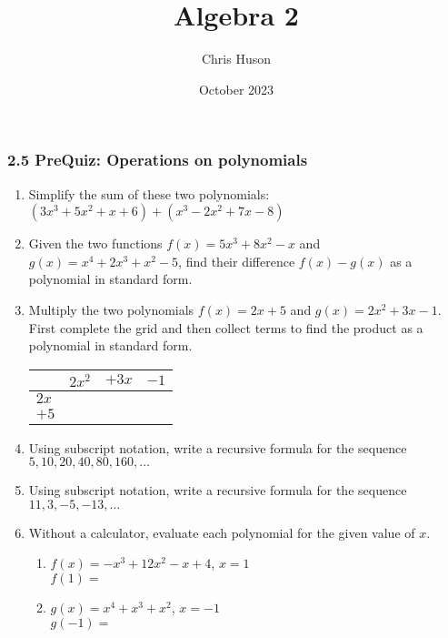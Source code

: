 \documentclass[12pt, twoside]{article}
\title{Algebra 2}
\author{Chris Huson}
\date{October 2023}
\begin{document}
\subsubsection*{2.5 PreQuiz: Operations on polynomials}
\begin{enumerate}

\item Simplify the sum of these two polynomials: $(3x^3+5x^2+x+6)+(x^3-2x^2+7x-8)$ \vspace{2cm}

\item Given the two functions $f(x)=5x^3+8x^2-x$ and $g(x)=x^4+2x^3+x^2-5$, find their difference $f(x)-g(x)$ as a polynomial in standard form. \vspace{3cm}

\item Multiply the two polynomials $f(x)=2x+5$ and $g(x)=2x^2+3x-1$. First complete the grid and then collect terms to find the product as a polynomial in standard form. \\[0.25cm]
\begin{tabular}{|p{1cm}|p{3cm}|p{3cm}|p{3cm}|}
    \hline
     & $2x^2$ & $+3x$ & $-1$ \\
    \hline
    $2x$ &  & & \\[0.5cm]
    \hline
    $+5$ &  & & \\[0.5cm]
    \hline
\end{tabular} \vspace{4cm}

\item Using subscript notation, write a recursive formula for the sequence $5, 10, 20, 40, 80, 160, \dots$ \vspace{2cm}

\item Using subscript notation, write a recursive formula for the sequence $11, 3, -5, -13, \dots$ 

\newpage

\item Without a calculator, evaluate each polynomial for the given value of $x$.
\begin{multicols}{2}
    \begin{enumerate}[itemsep=1cm]
        \item $f(x)=-x^3+12x^2-x+4$, $x=1$ \\[0.25cm] 
        $f(1) = $ \vspace{2cm}
        \item $g(x)=x^4+x^3+x^2$, $x=-1$ \\[0.25cm] 
        $g(-1) = $ \vspace{2cm}
    \end{enumerate}
    \end{multicols}


\end{enumerate}
\end{document}
